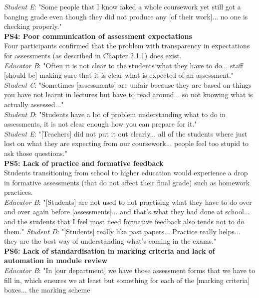 \textit{Student E}: "Some people that I know faked a whole coursework yet still got a banging grade 
even though they did not produce any [of their work]... no one is checking properly."
\vspace{0.25cm}\\
\textbf{PS4: Poor communication of assessment expectations}\\
Four participants confirmed that the problem with transparency in expectations for 
assessments (as described in Chapter 2.1.1) does exist.\\
\textit{Educator B}: "Often it is not clear to the students what they have to do... staff [should be] 
making sure that it is clear what is expected of an assessment."\\
\textit{Student C}: "Sometimes [assessments] are unfair because they are based on things you have 
not learnt in lectures but have to read around... so not knowing what is actually assessed..." \\
\textit{Student D}: "Students have a lot of problem understanding what to do in assessments, it is not clear enough 
how you can prepare for it."\\
\textit{Student E}: "[Teachers] did not put it out clearly... all of the students where just lost on what 
they are expecting from our coursework... people feel too stupid to ask those questions."
\vspace{0.25cm}\\
\textbf{PS5: Lack of practice and formative feedback}\\
Students transitioning from school to higher education would experience a drop in formative assessments
(that do not affect their final grade) such as homework practices.\\
\textit{Educator B}: "[Students] are not used to not practising what they have to do over and over again 
before [assessments]... and that's what they had done at school... and the students that I feel most need 
formative feedback also tends not to do them."
\textit{Student D}: "[Students] really like past papers... Practice really helps... they are the best 
way of understanding what's coming in the exams."
\vspace{0.25cm}\\
\textbf{PS6: Lack of standardisation in marking criteria and lack of automation in module review}\\
\textit{Educator B}: "In [our department] we have those assessment forms that we have to fill in, 
which ensures we at least but something for each of the [marking criteria] boxes... the marking scheme 
